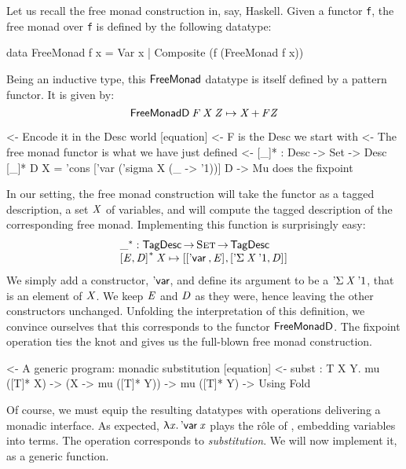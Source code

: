 \newcommand{\FMFreeMonad}{\D{FreeMonad}}
\newcommand{\FMFreeMonadD}{\D{FreeMonadD}}
\newcommand{\FMVar}{\C{Var}}
\newcommand{\FMComposite}{\C{Composite}}

Let us recall the free monad construction in, say, Haskell. Given a
functor \texttt{f}, the free monad over \texttt{f} is defined by the
following datatype:
%
\begin{code}
data FreeMonad f x
    = Var x
    | Composite (f (FreeMonad f x))
\end{code}
%
Being an inductive type, this $\FMFreeMonad$ datatype is itself
defined by a pattern functor. It is given by:
%
\[
\FMFreeMonadD\: \V{F}\: \V{X}\: \V{Z} \mapsto \V{X} \mathop{\D{+}} \V{F} \V{Z}
\]

\begin{wstructure}
    <- Encode it in the Desc world [equation]
        <- F is the Desc we start with
        <- The free monad functor is what we have just defined
        <- [\_]* : Desc -> Set -> Desc
           [\_]* D X = 'cons ['var ('sigma X (\_ -> '1))] D
        -> Mu does the fixpoint
\end{wstructure}

In our setting, the free monad construction will take the functor as a
tagged description, a set $\V{X}$ of variables, and will compute the
tagged description of the corresponding free monad. Implementing this
function is surprisingly easy:
%
\[\stk{
\FreeMonad{\_} : \TagDesc \To \Set \To \TagDesc \\
\FreeMonad{\pair{\V{E}}{\V{D}}{}}\:\V{X} \mapsto
    \pair{\pair{\DVar{}}{\V{E}}{}}
         {\pair{\DSigma{\V{X}}{\DUnit}}{\V{D}}{}}{}
}\]
%
We simply add a constructor, $\SYMBDVar$, and define its argument to
be a $\DSigma{\V{X}}{\DUnit}$, that is an element of $\V{X}$. We keep
$\V{E}$ and $\V{D}$ as they were, hence leaving the other constructors
unchanged. Unfolding the interpretation of this definition, we
convince ourselves that this corresponds to the functor
$\FMFreeMonadD$. The fixpoint operation ties the knot and gives us
the full-blown free monad construction.

\begin{wstructure}
<- A generic program: monadic substitution [equation]
    <- subst : \forall T X Y. mu ([T]* X) -> (X -> mu ([T]* Y)) -> mu ([T]* Y)
        -> Using Fold
\end{wstructure}

Of course, we must equip the resulting datatypes with operations
delivering a monadic interface. As expected, \(\LAM{\x}\DVar{\x}\)
plays the r\^ole of \return, embedding variables into terms. The
\bind operation corresponds to \emph{substitution}. We will now
implement it, as a generic function.


